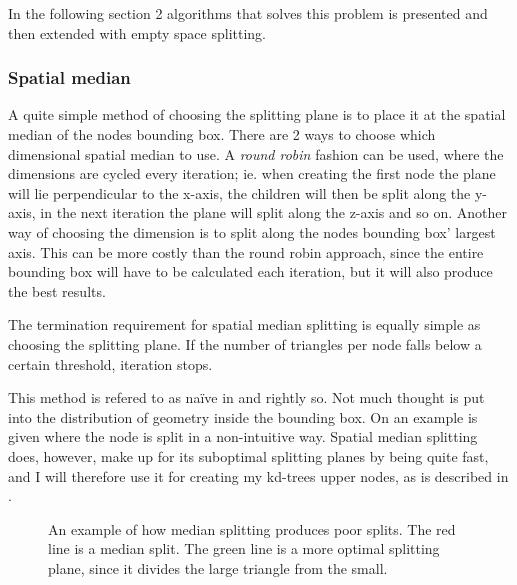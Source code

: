 
In the following section 2 algorithms that solves this problem is
presented and then extended with empty space splitting.


\subsubsection{Spatial median}



A quite simple method of choosing the splitting plane is to place it
at the spatial median of the nodes bounding box. There are 2 ways to
choose which dimensional spatial median to use. A \textit{round robin}
fashion can be used, where the dimensions are cycled every iteration;
ie. when creating the first node the plane will lie perpendicular to
the x-axis, the children will then be split along the y-axis, in the
next iteration the plane will split along the z-axis and so
on. Another way of choosing the dimension is to split along the nodes
bounding box' largest axis. This can be more costly than the round
robin approach, since the entire bounding box will have to be
calculated each iteration, but it will also produce the best results.

The termination requirement for spatial median splitting is equally
simple as choosing the splitting plane. If the number of triangles per
node falls below a certain threshold, iteration stops.


This method is refered to as naïve in  and
rightly so. Not much thought is put into the distribution of geometry
inside the bounding box. On  an example is given
where the node is split in a non-intuitive way. Spatial median
splitting does, however, make up for its suboptimal splitting planes
by being quite fast, and I will therefore use it for creating my
kd-trees upper nodes, as is described in .

\begin{figure}
  \centering
  \caption{An example of how median splitting produces poor
    splits. The red line is a median split. The green line is a more
    optimal splitting plane, since it divides the large triangle from
    the small.}
  \label{fig:crapMedian}
\end{figure}


